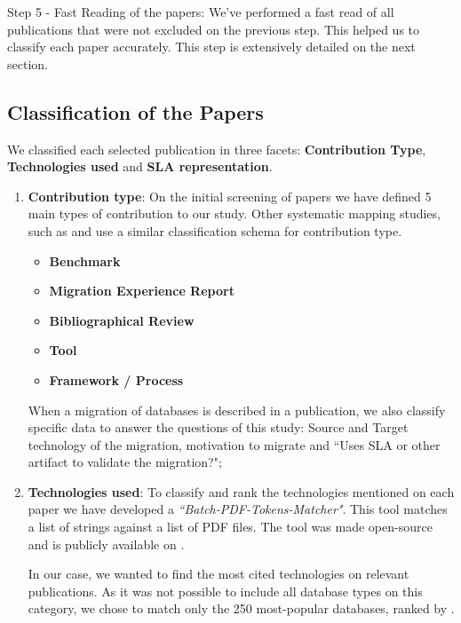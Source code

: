 \documentclass{article}
\begin{document}
Step 5 - Fast Reading of the papers: We've performed a fast read of all publications that were not excluded on the previous step. This helped us to classify each paper accurately. This step is extensively detailed on the next section. 


\subsection{Classification of the Papers}

We classified each selected publication in three facets: \textbf{Contribution Type}, \textbf{Technologies used} and \textbf{SLA representation}. 


\begin{enumerate}
    \item \textbf{Contribution type}: On the initial screening of papers we have defined 5 main types of contribution to our study. Other systematic mapping studies, such as \cite{6405289} and \cite{Ameller201542} use a similar classification schema for contribution type.
    \begin{itemize}
      \item \textbf{Benchmark}
      \item \textbf{Migration Experience Report}
      \item \textbf{Bibliographical Review}
      \item \textbf{Tool}
      \item \textbf{Framework / Process}
    \end{itemize}

    When a migration of databases is described in a publication, we also classify specific data to answer the questions of this study:  Source and Target technology of the migration, motivation to migrate and ``Uses SLA or other artifact to validate the migration?"; 

    \item \textbf{Technologies used}: To classify and rank the technologies mentioned on each paper we have developed a \textit{``Batch-PDF-Tokens-Matcher"}. This tool matches a list of strings against a list of PDF files. The tool was made open-source and is publicly available on \cite{pythonBatchPDFTokenMatcher}.

    In our case, we wanted to find the most cited technologies on relevant publications. As it was not possible to include all database types on this category, we chose to match only the 250 most-popular databases, ranked by \cite{dbranking}.


\end{enumerate}
\end{document}
